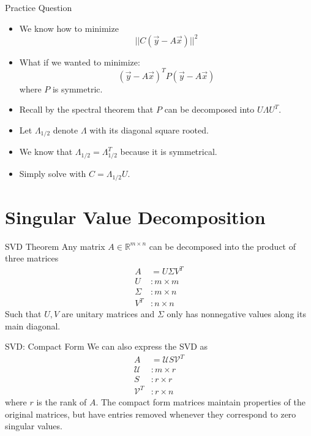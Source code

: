 \documentclass{beamer}
\begin{document}
\begin{frame}{Practice Question}
\begin{itemize}
\item We know how to minimize 
\[||C (\Vec{y} - A \Vec{x})||^2 \]
\item What if we wanted to minimize:
\[(\Vec{y} - A \Vec{x})^T P (\Vec{y} - A \Vec{x})\]
where $P$ is symmetric.
\item Recall by the spectral theorem that $P$ can be decomposed into $U \Lambda U^T$. 
\item Let $\Lambda_{1/2}$ denote $\Lambda$ with its diagonal square rooted.
\item We know that $\Lambda_{1/2} = \Lambda_{1/2}^T$ because it is symmetrical.
\item Simply solve with $C = \Lambda_{1/2}U$.
\end{itemize}
\end{frame}

\section[SVD]{Singular Value Decomposition}

\begin{frame}{SVD Theorem}
Any matrix $A \in \mathbb{R}^{m \times n}$ can be decomposed into the product of three matrices
\begin{align*}
A &= U \Sigma V^T \\
U &: m \times m \\
\Sigma &: m \times n \\
V^T &: n \times n
\end{align*}
Such that $U, V$ are unitary matrices and $\Sigma$ only has nonnegative values along its main diagonal.

\end{frame}

\begin{frame}{SVD: Compact Form}
We can also express the SVD as
\begin{align*}
A &= \mathcal{U} S \mathcal{V}^T \\
\mathcal{U} &: m \times r \\
S &: r \times r \\
\mathcal{V}^T &: r \times n
\end{align*}
where $r$ is the rank of $A$. The compact form matrices maintain properties of the original matrices, but have entries removed whenever they correspond to zero singular values.

\end{frame}
\end{document}

